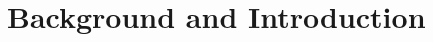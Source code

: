 


\clearpage
\chapter{Background and Introduction}
\label{intro_chapter}
\label{nuclear_chapter}






